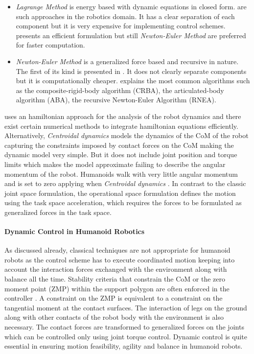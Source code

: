 \begin{itemize}
    \item \textit{Lagrange Method} is energy based with dynamic equations in closed form. \cite{uicker1969dynamic,kahn1969near,bejczy1974robot} are such approaches in the robotics domain. It has a clear separation of each component but it is very expensive  for implementing control schemes. \cite{hollerbach1980recursive} presents an efficient formulation but still \textit{Newton-Euler Method} are preferred for faster computation.
    \item \textit{Newton-Euler Method} is a generalized force based and recursive in nature. The first of its kind is presented in \cite{orin1979kinematic}. It does not clearly separate components but it is computationally cheaper. \cite{Featherstone2009} explains the most common algorithms such as the composite-rigid-body algorithm (CRBA), the articulated-body algorithm (ABA), the recursive Newton-Euler Algorithm (RNEA). 
\end{itemize}
\cite{spong1992remarks} uses an hamiltonian approach for the analysis of the robot dynamics and there exist certain numerical methods to integrate hamiltonian equations efficiently. Alternatively, \textit{Centroidal dynamics} \cite{orin2013centroidal,orin2008centroidal} models the dynamics of the CoM of the robot capturing the constraints imposed by contact forces on the CoM making the dynamic model very simple. But it does not include joint position and torque limits which makes the model approximate failing to describe the angular momentum of the robot. Humanoids walk with very little angular momentum and is set to zero applying when \textit{Centroidal dynamics} .
In contrast to the classic joint space formulation, the operational space formulation \cite{Khatib1987} defines the motion using the task space acceleration, which requires the forces to be formulated as generalized forces in the task space.

\paragraph{Dynamic Control in Humanoid Robotics}
As discussed already, classical techniques are not appropriate for humanoid robots as the control scheme has to execute coordinated motion keeping into account the interaction forces exchanged with the environment along with balance all the time. Stability criteria that constrain the CoM or the zero moment point (ZMP) within the support polygon are often enforced in the controller \cite{wieber2002stability}. A constraint on the ZMP is equivalent to a constraint on the tangential moment at the contact surfaces. The interaction of legs on the ground along with other contacts of the robot body with the environment is also necessary. The contact forces are transformed to generalized forces on the joints which can be controlled only using joint torque control. Dynamic control is quite essential in ensuring motion feasibility, agility and balance in 
humanoid robots.

